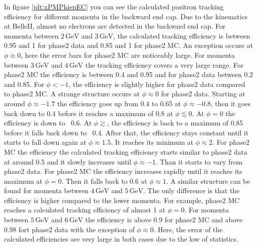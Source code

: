 \documentclass[a4paper,11pt,twosided,final,german,openbib,pdftex,listof=totoc,bibliography=totoc]{scrbook}
\begin{document}
In figure \ref{plt:xPMPhiepEC} you can see the calculated positron tracking efficiency for different momenta in the backward end cap. 
Due to the kinematics at BelleII, almost no electrons are detected in the backward end cap. For momenta between $2\,\textrm{GeV}$ and $3\,\textrm{GeV}$, the calculated tracking efficiency is between 0.95 and 1 for phase2 data and 0.85 and 1 for phase2 MC. An exception occurs at $\phi \approx 0$, here the error bars for phase2 MC are noticeably large. 
For momenta between $3\,\textrm{GeV}$ and $4\,\textrm{GeV}$ the tracking efficiency covers a very large range. For phase2 MC the efficiency is between 0.4 and 0.95 and for phase2 data between 0.2 and 0.85. For $\phi <  -1$, the efficiency is slightly higher for phase2 data compared to phase2 MC. 
A strange structure occurs at $\phi \approx 0$ for phase2 data. Starting at around $\phi \approx -1.7$ the efficiency goes up from 0.4 to 0.65 at $\phi \approx -0.8$, then it goes back down to 0.4 before it reaches a maximum of 0.8 at $\phi \lesssim 0$.
At $\phi =0$ the efficiency is down to ~0.6. At $\phi \gtrsim$, the efficiency is back to a maximum of 0.85 before it falls back down to ~0.4.
After that, the efficiency stays constant until it starts to fall down again at $\phi \approx 1.5$. It reaches its minimum at $\phi \approx 2$.
For phase2 MC the efficiency the calculated tracking efficiency starts similar to phase2 data at around 0.5 and it slowly increases until $\phi \approx -1$. Than it starts to vary from phase2 data. For phase2 MC the efficiency  increases rapidly until it reaches its maximum at $\phi = 0$. Then it falls back to 0.6 at $\phi \approx 1$.
A similar structure can be found for momenta between $4\,\textrm{GeV}$ and $5\,\textrm{GeV}$. The only difference is that the efficiency is higher compared to the lower momenta. For example, phase2 MC reaches a calculated tracking efficiency of almost 1 at $\phi =0$.
For momenta between $5\,\textrm{GeV}$ and $6\,\textrm{GeV}$ the efficiency is above 0.9 for  phase2 MC and above 0.98 fort phase2 data with the exception of $\phi \approx 0$. Here, the error of the calculated efficiencies are very large in both cases due to the low of statistics.
\end{document}
